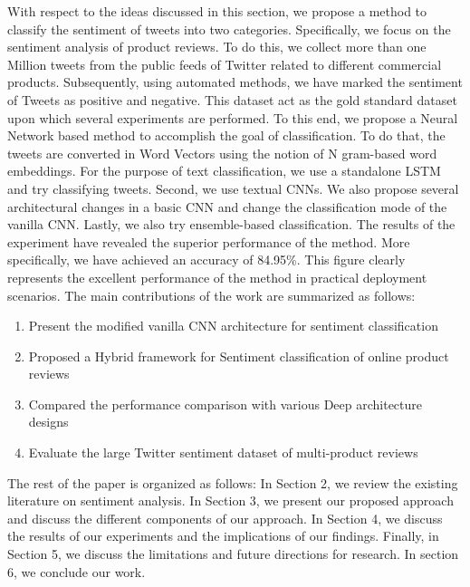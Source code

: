 With respect to the ideas discussed in this section, we propose a method to classify the sentiment of tweets into two categories. Specifically, we focus on the sentiment analysis of product reviews. To do this, we collect more than one Million tweets from the public feeds of Twitter related to different commercial products. Subsequently, using automated methods, we have marked the sentiment of Tweets as positive and negative. This dataset act as the gold standard dataset upon which several experiments are performed. To this end, we propose a Neural Network based method to accomplish the goal of classification. To do that, the tweets are converted in Word Vectors using the notion of N gram-based word embeddings. For the purpose of text classification, we use a standalone LSTM and try classifying tweets. Second, we use textual CNNs. We also propose several architectural changes in a basic CNN and change the classification mode of the vanilla CNN. Lastly, we also try ensemble-based classification. The results of the experiment have revealed the superior performance of the method. More specifically, we have achieved an accuracy of 84.95\%. This figure clearly represents the excellent performance of the method in practical deployment scenarios.   
The main contributions of the work are summarized as follows:
\begin{enumerate}
    \item Present the modified vanilla CNN architecture for sentiment classification
    \item Proposed a Hybrid framework for Sentiment classification of online product reviews
    \item Compared the performance comparison with various Deep architecture designs
    \item Evaluate the large Twitter sentiment dataset of multi-product reviews
    
\end{enumerate}

The rest of the paper is organized as follows: In Section 2, we review the existing literature on sentiment analysis. In Section 3, we present our proposed approach and discuss the different components of our approach. In Section 4, we discuss the results of our experiments and the implications of our findings. Finally, in Section 5, we discuss the limitations and future directions for research. In section 6, we conclude our work. 

